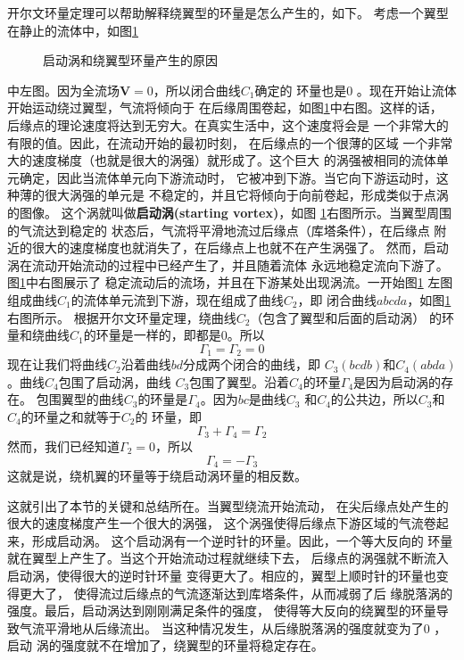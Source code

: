 开尔文环量定理可以帮助解释绕翼型的环量是怎么产生的，如下。
考虑一个翼型在静止的流体中，如图\ref{fig:startvortex}
\begin{figure}[!ht]
  \centering
  
  \caption{启动涡和绕翼型环量产生的原因}
  \label{fig:startvortex}
\end{figure}
中左图。因为全流场$\mathbf{V}=0$，所以闭合曲线$C_1$确定的
环量也是0 。现在开始让流体开始运动绕过翼型，气流将倾向于
在后缘周围卷起，如图\ref{fig:startvortex}中右图。这样的话，
后缘点的理论速度将达到无穷大。在真实生活中，这个速度将会是
一个非常大的有限的值。因此，在流动开始的最初时刻，
在后缘点的一个很薄的区域
一个非常大的速度梯度（也就是很大的涡强）就形成了。这个巨大
的涡强被相同的流体单元确定，因此当流体单元向下游流动时，
它被冲到下游。当它向下游运动时，这种薄的很大涡强的单元是
不稳定的，并且它将倾向于向前卷起，形成类似于点涡的图像。
这个涡就叫做{\bfseries 启动涡(starting vortex)}，如图
\ref{fig:startvortex}右图所示。当翼型周围的气流达到稳定的
状态后，气流将平滑地流过后缘点（库塔条件），在后缘点
附近的很大的速度梯度也就消失了，在后缘点上也就不在产生涡强了。
然而，启动涡在流动开始流动的过程中已经产生了，并且随着流体
永远地稳定流向下游了。图\ref{fig:startvortex}中右图展示了
稳定流动后的流场，并且在下游某处出现涡流。一开始图\ref{fig:startvortex}
左图组成曲线$C_1$的流体单元流到下游，现在组成了曲线$C_2$，即
闭合曲线$abcda$，如图\ref{fig:startvortex}右图所示。
根据开尔文环量定理，绕曲线$C_2$（包含了翼型和后面的启动涡）
的环量和绕曲线$C_1$的环量是一样的，即都是0。所以
\[
  \Gamma_1=\Gamma_2=0 
\]
现在让我们将曲线$C_2$沿着曲线$bd$分成两个闭合的曲线，即
$C_3(bcdb)$和$C_4(abda)$。曲线$C_4$包围了启动涡，曲线
$C_3$包围了翼型。沿着$C_4$的环量$\Gamma_4$是因为启动涡的存在。
包围翼型的曲线$C_3$的环量是$\Gamma_4$。因为$bc$是曲线$C_3$
和$C_4$的公共边，所以$C_3$和$C_4$的环量之和就等于$C_2$的
环量，即
\[
  \Gamma_3+\Gamma_4=\Gamma_2
\]
然而，我们已经知道$\Gamma_2=0 $，所以
\[
  \Gamma_4=-\Gamma_3
\]
这就是说，绕机翼的环量等于绕启动涡环量的相反数。

这就引出了本节的关键和总结所在。当翼型绕流开始流动，
在尖后缘点处产生的很大的速度梯度产生一个很大的涡强，
这个涡强使得后缘点下游区域的气流卷起来，形成启动涡。
这个启动涡有一个逆时针的环量。因此，一个等大反向的
环量就在翼型上产生了。当这个开始流动过程就继续下去，
后缘点的涡强就不断流入启动涡，使得很大的逆时针环量
变得更大了。相应的，翼型上顺时针的环量也变得更大了，
使得流过后缘点的气流逐渐达到库塔条件，从而减弱了后
缘脱落涡的强度。最后，启动涡达到刚刚满足条件的强度，
使得等大反向的绕翼型的环量导致气流平滑地从后缘流出。
当这种情况发生，从后缘脱落涡的强度就变为了0 ，启动
涡的强度就不在增加了，绕翼型的环量将稳定存在。

